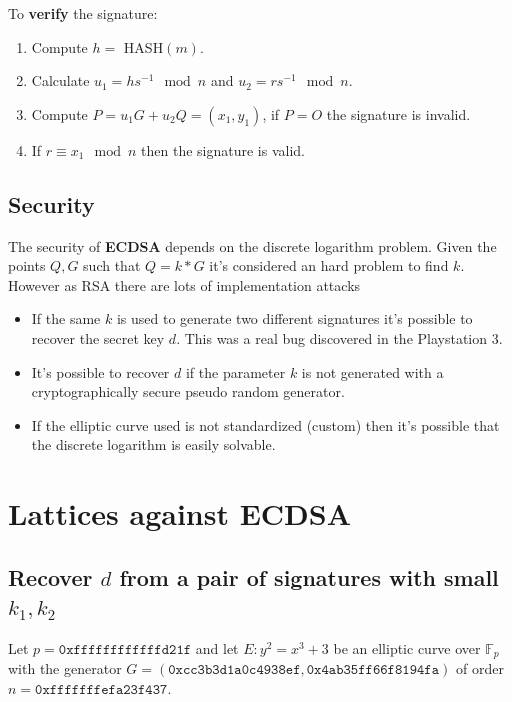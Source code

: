 \documentclass[a4paper,12pt]{report}
\newcommand{\F}{\mathbb{F}}
\begin{document}
\vspace*{10px}

To \textbf{verify} the signature:

\begin{enumerate}
    \item Compute $h = $ HASH$(m)$.
    \item Calculate $u_1 = hs^{-1} \mod n$ and $u_2 = rs^{-1} \mod n$.
    \item Compute $P = u_1G + u_2Q = (x_1, y_1)$, if $P = O$ the signature is invalid.
    \item If $r \equiv x_1 \mod n$ then the signature is valid.
\end{enumerate}

\subsection{Security}

The security of \textbf{ECDSA} depends on the discrete logarithm problem.
Given the points $Q, G$ such that $Q = k*G$ it's considered an hard problem to find $k$.
However as RSA there are lots of implementation attacks

\begin{itemize}
    \item If the same $k$ is used to generate two different signatures it's possible to recover the secret key $d$. This was a real bug 
        discovered in the Playstation 3.
    \item It's possible to recover $d$ if the parameter $k$ is not generated with a cryptographically secure pseudo random generator.
    \item If the elliptic curve used is not standardized (custom) then it's possible that the discrete logarithm is easily solvable.
\end{itemize}

\section{Lattices against ECDSA}

\subsection{Recover $d$ from a pair of signatures with small $k_1, k_2$}

Let $p = \texttt{0xffffffffffffd21f}$ and let $E: y^2 = x^3 + 3$ be an elliptic curve over $\F_p$ with the generator
$G = (\texttt{0xcc3b3d1a0c4938ef}, \texttt{0x4ab35ff66f8194fa})$ of order $n = \texttt{0xfffffffefa23f437}$.
\end{document}
